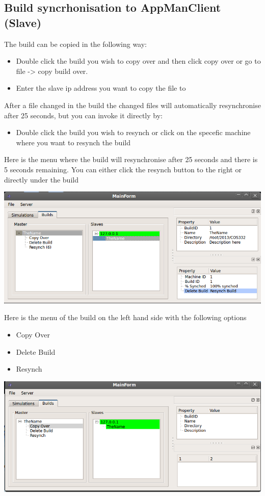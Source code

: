 \documentclass[a4paper,12pt,final]{article}
\begin{document}
\subsection{Build syncrhonisation to AppManClient (Slave)}
The build can be copied in the following way:
\begin{itemize}
\item Double click the build you wish to copy over and then click copy over or go to file -> copy build over.
\item Enter the slave ip address you want to copy the file to
\end{itemize}

After a file changed in the build the changed files will automatically resynchronise after 25 seconds, but you can invoke it directly by:
\begin{itemize}
\item Double click the build you wish to resynch or click on the specefic machine where you want to resynch the build
\end{itemize}
 
 
Here is the menu where the build will resynchronise after 25 seconds and there is 5 seconds remaining. You can either click the resynch button to the right or directly under the build
\begin{center}
  	\includegraphics[scale=0.4]{5secResynch.png}
 \end{center}
 
 
Here is the menu of the build on the left hand side with the following options
\begin{itemize}
\item Copy Over

\item Delete Build
\item Resynch
\end{itemize}
\begin{center}
  	\includegraphics[scale=0.4]{MENU.png}
 \end{center}
 
\end{document}
